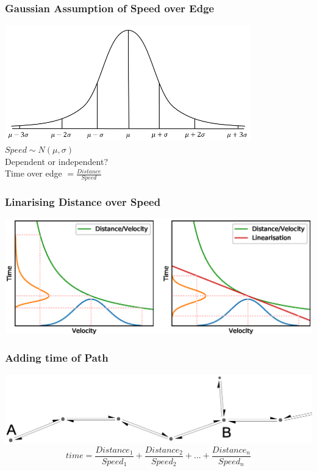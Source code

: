 \documentclass{beamer}
\begin{document}
	\begin{frame}
		\frametitle{Gaussian Assumption of Speed over Edge}
		\begin{center}
			\includegraphics[width=0.8\textwidth]{normalDist2.png}
			\\$Speed \sim N(\mu, \sigma)$
			\pause
			\\Dependent or independent?
			\pause
			\\[0.5cm]Time over edge $= \frac{Distance}{Speed}$
		\end{center}
	\end{frame}

	\begin{frame}
		\frametitle{Linarising Distance over Speed}
		\includegraphics[width=\textwidth]{linearisation.eps}
	\end{frame}

	\begin{frame}
		\frametitle{Adding time of Path}
		\includegraphics[width=\textwidth]{simpleDCEL.eps}
		\vspace{0.3cm}
		\begin{equation*}
			time = \frac{Distance_1}{Speed_1}+\frac{Distance_2}{Speed_2}+ ... +\frac{Distance_n}{Speed_n}
		\end{equation*}
	\end{frame}
\end{document}
